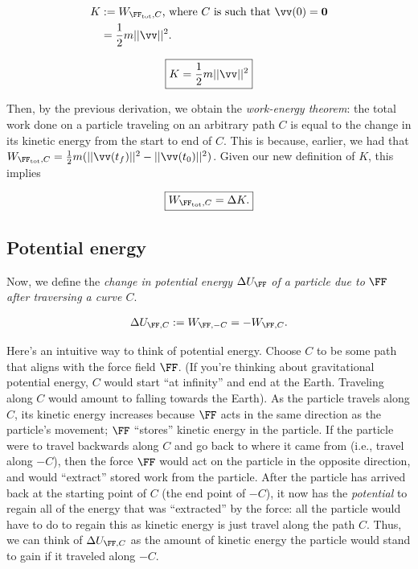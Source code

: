 \documentclass{article}
\begin{document}
\begin{align*}
    K &:= W_{\FF_{\text{tot}}, C} \text{, where $C$ is such that $\vv(0) = \mathbf{0}$} \\
       &= \frac{1}{2}m||\vv||^2.
\end{align*}

\begin{align*}
    \boxed
    {
        K = \frac{1}{2}m||\vv||^2
    }
\end{align*}

Then, by the previous derivation, we obtain the \textit{work-energy theorem}: the total work done on a particle traveling on an arbitrary path $C$ is equal to the change in its kinetic energy from the start to end of $C$. This is because, earlier, we had that $W_{\FF_{\text{tot}}, C} = \frac{1}{2} m (||\vv(t_f)||^2 - ||\vv(t_0)||^2)$. Given our new definition of $K$, this implies

\begin{align*}
    \boxed
    {
        W_{\FF_{\text{tot}}, C} = \Delta K.
    }
\end{align*}

\subsection*{Potential energy}

Now, we define the \textit{change in potential energy} $\Delta U_{\FF}$ \textit{of a particle due to} $\FF$ \textit{after traversing a curve $C$}. 

\begin{align*}
    \Delta U_{\FF, C} := W_{\FF, -C} = -W_{\FF, C}.
\end{align*}

Here's an intuitive way to think of potential energy. Choose $C$ to be some path that aligns with the force field $\FF$. (If you're thinking about gravitational potential energy, $C$ would start ``at infinity'' and end at the Earth. Traveling along $C$ would amount to falling towards the Earth). As the particle travels along $C$, its kinetic energy increases because $\FF$ acts in the same direction as the particle's movement; $\FF$ ``stores'' kinetic energy in the particle. If the particle were to travel backwards along $C$ and go back to where it came from (i.e., travel along $-C$), then the force $\FF$ would act on the particle in the opposite direction, and would ``extract'' stored work from the particle. After the particle has arrived back at the starting point of $C$ (the end point of $-C$), it now has the \textit{potential} to regain all of the energy that was ``extracted'' by the force: all the particle would have to do to regain this as kinetic energy is just travel along the path $C$. Thus, we can think of $\Delta U_{\FF, C}$ as the amount of kinetic energy the particle would stand to gain if it traveled along $-C$.
\end{document}
